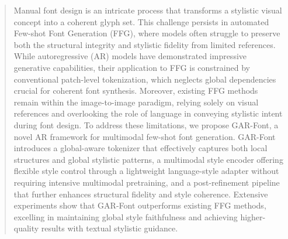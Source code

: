 \begin{abstract}
\noindent Manual font design is an intricate process that transforms a stylistic visual concept into a coherent glyph set. This challenge persists in automated Few-shot Font Generation (FFG), where models often struggle to preserve both the structural integrity and stylistic fidelity from limited references. While autoregressive (AR) models have demonstrated impressive generative capabilities, their application to FFG is constrained by conventional patch-level tokenization, which neglects global dependencies crucial for coherent font synthesis. Moreover, existing FFG methods remain within the image-to-image paradigm, relying solely on visual references and overlooking the role of language in conveying stylistic intent during font design. To address these limitations, we propose GAR-Font, a novel AR framework for multimodal few-shot font generation. GAR-Font introduces a global-aware tokenizer that effectively captures both local structures and global stylistic patterns, a multimodal style encoder offering flexible style control through a lightweight language-style adapter without requiring intensive multimodal pretraining, and a post-refinement pipeline that further enhances structural fidelity and style coherence. Extensive experiments show that GAR-Font outperforms existing FFG methods, excelling in maintaining global style faithfulness and achieving higher-quality results with textual stylistic guidance.


\end{abstract}